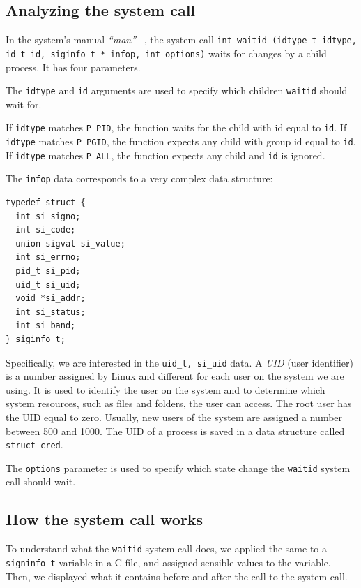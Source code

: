 \documentclass{masterthesis}
\begin{document}
\subsection{Analyzing the system call}
\label{subsect:waitid}

In the system's manual \emph{``man''} ~\cite{torvalds2002Linux}, the system call \texttt{int waitid (idtype_t idtype, id_t id, siginfo_t * infop, int options)} waits for changes by a child process. It has four parameters.

The \texttt{idtype} and \texttt{id} arguments are used to specify which children \texttt{waitid} should wait for.

If \texttt{idtype} matches \texttt{P\_PID}, the function waits for the child with id equal to \texttt{id}.
If \texttt{idtype} matches \texttt{P\_PGID}, the function expects any child with group id equal to \texttt{id}.
If \texttt{idtype} matches \texttt{P\_ALL}, the function expects any child and \texttt{id} is ignored.

The \texttt{infop} data corresponds to a very complex data structure:

\begin{lstlisting}
typedef struct {
  int si_signo;
  int si_code;
  union sigval si_value;
  int si_errno;
  pid_t si_pid;
  uid_t si_uid;
  void *si_addr;
  int si_status;
  int si_band;
} siginfo_t;
\end{lstlisting}
Specifically, we are interested in the \texttt{uid\_t, si\_uid} data.
A \emph{UID} (user identifier) is a number assigned by Linux and different for each user on the system we are using.
It is used to identify the user on the system and to determine which system resources, such as files and folders, the user can access.
The root user has the UID equal to zero. Usually, new users of the system are assigned a number between 500 and 1000.
The UID of a process is saved in a data structure called \texttt{struct cred}.

The \texttt{options} parameter is used to specify which state change the \texttt{waitid} system call should wait.

\subsection{How the system call works}
\label{subsect:how_waitid}
To understand what the \texttt{waitid} system call does, we applied the same to a \texttt{signinfo\_t} variable in a C file, and assigned sensible values to the variable. Then, we displayed what it contains before and after the call to the system call.
\end{document}
